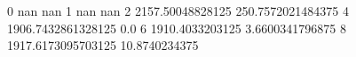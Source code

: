 0 nan nan
1 nan nan
2 2157.50048828125 250.7572021484375
4 1906.7432861328125 0.0
6 1910.4033203125 3.6600341796875
8 1917.6173095703125 10.8740234375
